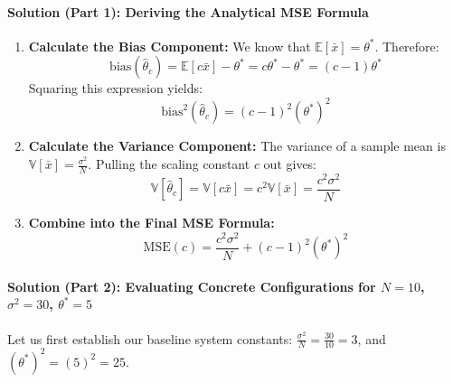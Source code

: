\documentclass{article}
\begin{document}
\paragraph{Solution (Part 1): Deriving the Analytical MSE Formula}
\begin{enumerate}
    \item \textbf{Calculate the Bias Component:}
    We know that $\mathbb{E}[\bar{x}] = \theta^*$. Therefore:
    \begin{equation}
    \text{bias}(\hat{\theta}_c) = \mathbb{E}[c\bar{x}] - \theta^* = c\theta^* - \theta^* = (c - 1)\theta^*
    \end{equation}
    Squaring this expression yields:
    \begin{equation}
    \text{bias}^2(\hat{\theta}_c) = (c - 1)^2 (\theta^*)^2
    \end{equation}
    
    \item \textbf{Calculate the Variance Component:}
    The variance of a sample mean is $\mathbb{V}[\bar{x}] = \frac{\sigma^2}{N}$. Pulling the scaling constant $c$ out gives:
    \begin{equation}
    \mathbb{V}[\hat{\theta}_c] = \mathbb{V}[c\bar{x}] = c^2 \mathbb{V}[\bar{x}] = \frac{c^2 \sigma^2}{N}
    \end{equation}
    
    \item \textbf{Combine into the Final MSE Formula:}
    \begin{equation}
    \text{MSE}(c) = \frac{c^2 \sigma^2}{N} + (c - 1)^2 (\theta^*)^2
    \end{equation}
\end{enumerate}

\paragraph{Solution (Part 2): Evaluating Concrete Configurations for $N=10$, $\sigma^2=30$, $\theta^*=5$}
Let us first establish our baseline system constants: $\frac{\sigma^2}{N} = \frac{30}{10} = 3$, and $(\theta^*)^2 = (5)^2 = 25$.
\end{document}
